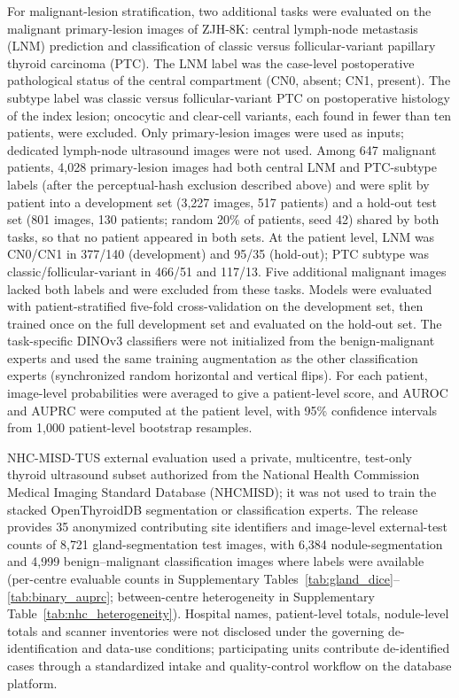 \documentclass[fleqn,10pt]{wlscirep}
\begin{document}
For malignant-lesion stratification, two additional tasks were evaluated on the malignant primary-lesion images of ZJH-8K: central lymph-node metastasis (LNM) prediction and classification of classic versus follicular-variant papillary thyroid carcinoma (PTC). The LNM label was the case-level postoperative pathological status of the central compartment (CN0, absent; CN1, present). The subtype label was classic versus follicular-variant PTC on postoperative histology of the index lesion; oncocytic and clear-cell variants, each found in fewer than ten patients, were excluded. Only primary-lesion images were used as inputs; dedicated lymph-node ultrasound images were not used. Among 647 malignant patients, 4,028 primary-lesion images had both central LNM and PTC-subtype labels (after the perceptual-hash exclusion described above) and were split by patient into a development set (3,227 images, 517 patients) and a hold-out test set (801 images, 130 patients; random 20\% of patients, seed 42) shared by both tasks, so that no patient appeared in both sets. At the patient level, LNM was CN0/CN1 in 377/140 (development) and 95/35 (hold-out); PTC subtype was classic/follicular-variant in 466/51 and 117/13. Five additional malignant images lacked both labels and were excluded from these tasks. Models were evaluated with patient-stratified five-fold cross-validation on the development set, then trained once on the full development set and evaluated on the hold-out set. The task-specific DINOv3 classifiers were not initialized from the benign-malignant experts and used the same training augmentation as the other classification experts (synchronized random horizontal and vertical flips). For each patient, image-level probabilities were averaged to give a patient-level score, and AUROC and AUPRC were computed at the patient level, with 95\% confidence intervals from 1,000 patient-level bootstrap resamples.

NHC-MISD-TUS external evaluation used a private, multicentre, test-only thyroid ultrasound subset authorized from the National Health Commission Medical Imaging Standard Database (NHCMISD); it was not used to train the stacked OpenThyroidDB segmentation or classification experts. The release provides 35 anonymized contributing site identifiers and image-level external-test counts of 8{,}721 gland-segmentation test images, with 6{,}384 nodule-segmentation and 4{,}999 benign--malignant classification images where labels were available (per-centre evaluable counts in Supplementary Tables~\ref{tab:gland_dice}--\ref{tab:binary_auprc}; between-centre heterogeneity in Supplementary Table~\ref{tab:nhc_heterogeneity}). Hospital names, patient-level totals, nodule-level totals and scanner inventories were not disclosed under the governing de-identification and data-use conditions; participating units contribute de-identified cases through a standardized intake and quality-control workflow on the database platform.
\end{document}

